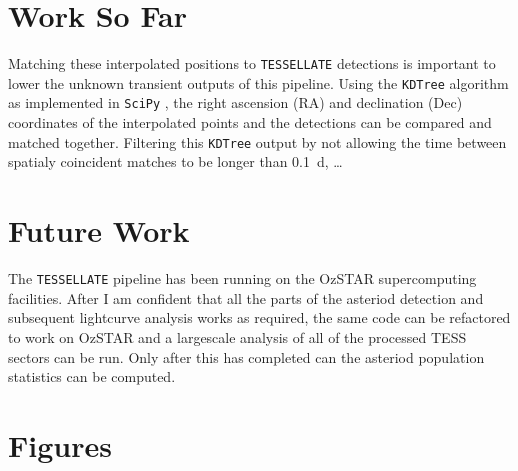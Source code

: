 \documentclass[12pt]{article}
\begin{document}
\section{Work So Far}



Matching these interpolated positions to \texttt{TESSELLATE} detections is important to lower the unknown transient outputs of this pipeline. 
Using the \texttt{KDTree} algorithm \citep{Maneewongvatana1999} as implemented in \texttt{SciPy} \citep{2020SciPy-NMeth}, the right ascension (RA) and  declination (Dec) coordinates of the interpolated points and the detections can be compared and matched together. 
Filtering this \texttt{KDTree} output by not allowing the time between spatialy coincident matches to be longer than \qty{0.1}{\day}, \dots 


\section{Future Work}


The \texttt{TESSELLATE} pipeline has been running on the OzSTAR supercomputing facilities. 
After I am confident that all the parts of the asteriod detection and subsequent lightcurve analysis works as required, the same code can be refactored to work on OzSTAR and a largescale analysis of all of the processed TESS sectors can be run. 
Only after this has completed can the asteriod population statistics can be computed. 


\section{Figures}

\def\bibfont{\tiny}


\end{document}

